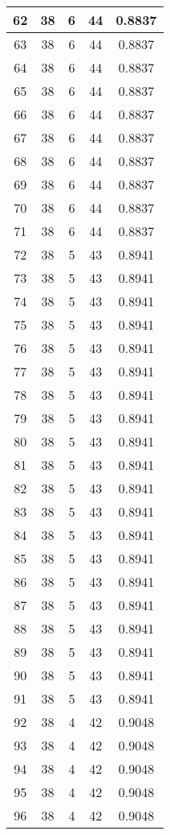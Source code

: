 \documentclass[letterpaper, 12pt]{article}
\begin{document}
\begin{longtable}{|c|c|c|c|c|}
\hline
62 & 38 & 6 & 44 & 0.8837 \\
\hline
63 & 38 & 6 & 44 & 0.8837 \\
\hline
64 & 38 & 6 & 44 & 0.8837 \\
\hline
65 & 38 & 6 & 44 & 0.8837 \\
\hline
66 & 38 & 6 & 44 & 0.8837 \\
\hline
67 & 38 & 6 & 44 & 0.8837 \\
\hline
68 & 38 & 6 & 44 & 0.8837 \\
\hline
69 & 38 & 6 & 44 & 0.8837 \\
\hline
70 & 38 & 6 & 44 & 0.8837 \\
\hline
71 & 38 & 6 & 44 & 0.8837 \\
\hline
72 & 38 & 5 & 43 & 0.8941 \\
\hline
73 & 38 & 5 & 43 & 0.8941 \\
\hline
74 & 38 & 5 & 43 & 0.8941 \\
\hline
75 & 38 & 5 & 43 & 0.8941 \\
\hline
76 & 38 & 5 & 43 & 0.8941 \\
\hline
77 & 38 & 5 & 43 & 0.8941 \\
\hline
78 & 38 & 5 & 43 & 0.8941 \\
\hline
79 & 38 & 5 & 43 & 0.8941 \\
\hline
80 & 38 & 5 & 43 & 0.8941 \\
\hline
81 & 38 & 5 & 43 & 0.8941 \\
\hline
82 & 38 & 5 & 43 & 0.8941 \\
\hline
83 & 38 & 5 & 43 & 0.8941 \\
\hline
84 & 38 & 5 & 43 & 0.8941 \\
\hline
85 & 38 & 5 & 43 & 0.8941 \\
\hline
86 & 38 & 5 & 43 & 0.8941 \\
\hline
87 & 38 & 5 & 43 & 0.8941 \\
\hline
88 & 38 & 5 & 43 & 0.8941 \\
\hline
89 & 38 & 5 & 43 & 0.8941 \\
\hline
90 & 38 & 5 & 43 & 0.8941 \\
\hline
91 & 38 & 5 & 43 & 0.8941 \\
\hline
92 & 38 & 4 & 42 & 0.9048 \\
\hline
93 & 38 & 4 & 42 & 0.9048 \\
\hline
94 & 38 & 4 & 42 & 0.9048 \\
\hline
95 & 38 & 4 & 42 & 0.9048 \\
\hline
96 & 38 & 4 & 42 & 0.9048 \\

\end{longtable}
\end{document}
